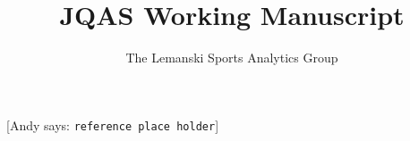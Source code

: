 \documentclass[11pt]{article} %
\title{JQAS Working Manuscript}
\author{The Lemanski Sports Analytics Group}
\newcommand{\andyc}[1]{[{\color{red}\sc Andy says: {\tt #1}}]}
\begin{document}
\maketitle


\newpage













\andyc{reference place holder}
\cite{Gelman}







\end{document}
